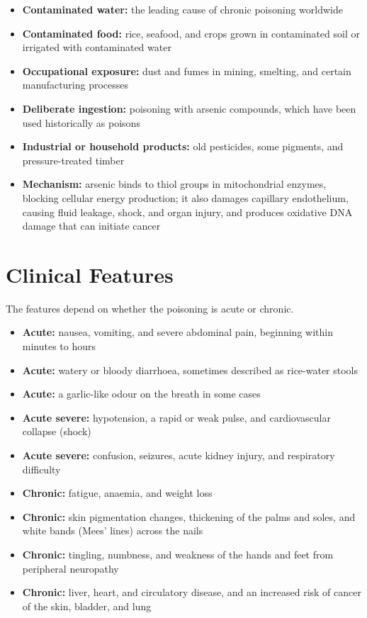 \begin{itemize}
    \item \textbf{Contaminated water:} the leading cause of chronic poisoning worldwide
    \item \textbf{Contaminated food:} rice, seafood, and crops grown in contaminated soil or irrigated with contaminated water
    \item \textbf{Occupational exposure:} dust and fumes in mining, smelting, and certain manufacturing processes
    \item \textbf{Deliberate ingestion:} poisoning with arsenic compounds, which have been used historically as poisons
    \item \textbf{Industrial or household products:} old pesticides, some pigments, and pressure-treated timber
    \item \textbf{Mechanism:} arsenic binds to thiol groups in mitochondrial enzymes, blocking cellular energy production; it also damages capillary endothelium, causing fluid leakage, shock, and organ injury, and produces oxidative DNA damage that can initiate cancer
\end{itemize}

\section*{Clinical Features}
The features depend on whether the poisoning is acute or chronic.

\begin{itemize}
    \item \textbf{Acute:} nausea, vomiting, and severe abdominal pain, beginning within minutes to hours
    \item \textbf{Acute:} watery or bloody diarrhoea, sometimes described as rice-water stools
    \item \textbf{Acute:} a garlic-like odour on the breath in some cases
    \item \textbf{Acute severe:} hypotension, a rapid or weak pulse, and cardiovascular collapse (shock)
    \item \textbf{Acute severe:} confusion, seizures, acute kidney injury, and respiratory difficulty
    \item \textbf{Chronic:} fatigue, anaemia, and weight loss
    \item \textbf{Chronic:} skin pigmentation changes, thickening of the palms and soles, and white bands (Mees' lines) across the nails
    \item \textbf{Chronic:} tingling, numbness, and weakness of the hands and feet from peripheral neuropathy
    \item \textbf{Chronic:} liver, heart, and circulatory disease, and an increased risk of cancer of the skin, bladder, and lung
\end{itemize}

